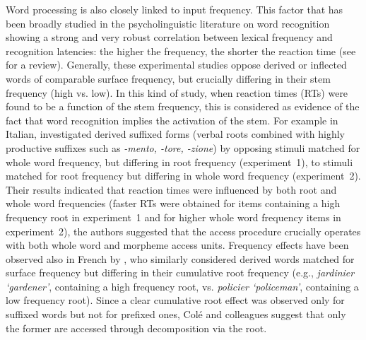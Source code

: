 \documentclass[output=paper]{langsci/langscibook}
\begin{document}
Word processing is also closely linked to input frequency. This
factor that has been broadly studied in the psycholinguistic literature
on word recognition showing a strong and very robust correlation between
lexical frequency and recognition latencies: the higher the frequency, the shorter the reaction time  (see %
\citealt{Ellis2002}
%
%
 for a review).
Generally, these experimental studies oppose derived or inflected words
of comparable surface frequency, but crucially differing in their stem
frequency (high vs. low). In this kind of study, when reaction times
(RTs) were found to be a function of the stem frequency, this is
considered as evidence of the fact that word recognition implies the
activation of the stem. For example in Italian, %
\citet{BuraniCaramazza1987} %
%
%
 investigated derived suffixed forms (verbal roots combined with
highly productive suffixes such as \emph{-mento, -tore, -zione}) by
opposing stimuli matched for whole word frequency, but differing in root
frequency (experiment~1), to stimuli matched for root frequency but differing
in whole word frequency (experiment~2). Their results indicated that reaction
times were influenced by both root and whole word frequencies (faster
RTs were obtained for items containing a high frequency root in experiment~1
and for higher whole word frequency items in experiment~2), the authors
suggested that the access procedure crucially operates with both
whole word and morpheme access units. Frequency effects have been
observed also in French by %
\citet{ColeBeauvillainSegui1989}%
%
, who
similarly considered derived words matched for surface frequency but
differing in their cumulative root frequency (e.g., \emph{jardinier
`gardener'}, containing a high frequency root, vs. \emph{policier
`policeman'}, containing a low frequency root). Since a clear cumulative
root effect was observed only for suffixed words but not for prefixed
ones, Colé and colleagues suggest that only the former are accessed
through decomposition via the root.
\end{document}
